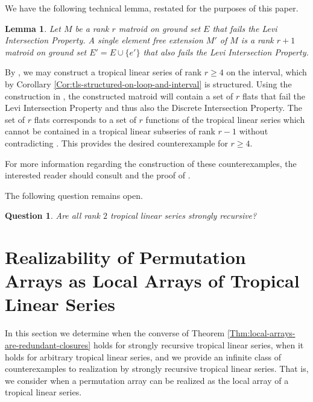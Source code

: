 \documentclass{amsart}
\newtheorem{lemma}[theorem]{Lemma}
\newtheorem{question}[theorem]{Question}
\begin{document}
	We have the following technical lemma, restated for the purposes of this paper.
	
	\begin{lemma}\cite[Proposition~7.5.5]{bjorner1999oriented}
		\label{Lem:LIP-extension}
		Let $M$ be a rank $r$ matroid on ground set $E$ that fails the Levi Intersection Property. A single element free extension $M'$ of $M$ is a rank $r+1$ matroid on ground set $E' = E \cup \{ e' \}$ that also fails the Levi Intersection Property.
	\end{lemma}
	
	By \cite[Theorem~6.3]{chang2025matroidal}, we may construct a tropical linear series of rank $r \geq 4$ on the interval, which by Corollary \ref{Cor:tls-structured-on-loop-and-interval} is structured. Using the construction in \cite[Example~6.6]{chang2025matroidal}, the constructed matroid will contain a set of $r$ flats that fail the Levi Intersection Property and thus also the Discrete Intersection Property. The set of $r$ flats corresponds to a set of $r$ functions of the tropical linear series which cannot be contained in a tropical linear subseries of rank $r-1$ without contradicting \cite[Corollary~4.8]{chang2025matroidal}. This provides the desired counterexample for $r \geq 4$.
	
	For more information regarding the construction of these counterexamples, the interested reader should consult \cite[Example~6.6]{chang2025matroidal} and the proof of \cite[Theorem~6.4]{wang2024lorentzian}.
	
	The following question remains open.
	
	\begin{question}
		\label{Quest:CLLS-are-SRTLS-r=2}
		Are all rank $2$ tropical linear series strongly recursive?
	\end{question}
	
	\section{Realizability of Permutation Arrays as Local Arrays of Tropical Linear Series}
	\label{Sec:Realizability}
	
	In this section we determine when the converse of Theorem \ref{Thm:local-arrays-are-redundant-closures} holds for strongly recursive tropical linear series, when it holds for arbitrary tropical linear series, and we provide an infinite class of counterexamples to realization by strongly recursive tropical linear series. That is, we consider when a permutation array can be realized as the local array of a tropical linear series.
	
\end{document}
